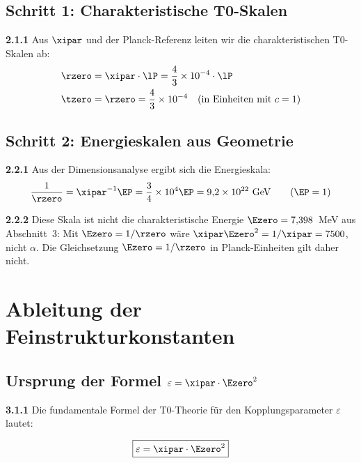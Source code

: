 	\subsection{Schritt 1: Charakteristische T0-Skalen}
	
	\noindent \textbf{2.1.1} Aus $\xipar$ und der Planck-Referenz leiten wir die charakteristischen T0-Skalen ab:
	\begin{align}
		\rzero &= \xipar \cdot \lP = \frac{4}{3} \times 10^{-4} \cdot \lP \\
		\tzero &= \rzero = \frac{4}{3} \times 10^{-4} \quad \text{(in Einheiten mit } c=1\text{)}
	\end{align}
	
	\subsection{Schritt 2: Energieskalen aus Geometrie}
	
	\noindent \textbf{2.2.1} Aus der Dimensionsanalyse ergibt sich die Energieskala:
	\begin{equation}
		\frac{1}{\rzero} = \xipar^{-1} \EP = \frac{3}{4} \times 10^{4} \EP = 9{,}2\times10^{22}~\text{GeV} \qquad (\EP = 1)
	\end{equation}
	
	\noindent \textbf{2.2.2} Diese Skala ist nicht die charakteristische Energie $\Ezero = 7{,}398$~MeV aus Abschnitt~3: Mit $\Ezero = 1/\rzero$ wäre $\xipar\Ezero^2 = 1/\xipar = 7500$, nicht $\alpha$. Die Gleichsetzung $\Ezero = 1/\rzero$ in Planck-Einheiten gilt daher nicht.
	
	\section{Ableitung der Feinstrukturkonstanten}
	
	\subsection{Ursprung der Formel $\varepsilon = \xipar \cdot \Ezero^2$}
	
	\noindent \textbf{3.1.1} Die fundamentale Formel der T0-Theorie für den Kopplungsparameter $\varepsilon$ lautet:
	\begin{keyresult}
		\begin{equation}
			\boxed{\varepsilon = \xipar \cdot \Ezero^2}
			\label{eq:epsilon_definition}
		\end{equation}
	\end{keyresult}
	
